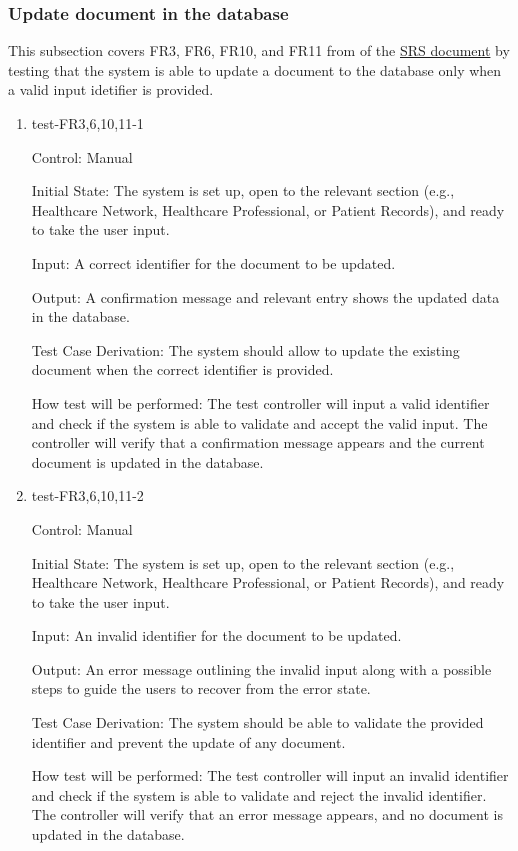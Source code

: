 \documentclass[12pt, titlepage]{article}
\begin{document}
\subsubsection{Update document in the database} \label{section:4.1.3}

This subsection covers FR3, FR6, FR10, and FR11 from of the \href{https://github.com/Inreet-Kaur/capstone/blob/main/docs/SRS/SRS.pdf}{SRS document} by testing that the system is able to update a document to the database only when a valid input idetifier is provided.

\begin{enumerate}

\item{test-FR3,6,10,11-1} \label{test-FR3,6,10,11-1}

Control: Manual

Initial State: The system is set up, open to the relevant section (e.g., Healthcare Network, Healthcare Professional, or Patient Records), and ready to take the user input.

Input: A correct identifier for the document to be updated.

Output: A confirmation message and relevant entry shows the updated data in the database.

Test Case Derivation: The system should allow to update the existing document when the correct identifier is provided.

How test will be performed: The test controller will input a valid identifier and check if the system is able to validate and accept the valid input. The controller will verify that a confirmation message appears and the current document is updated in the database.


\item{test-FR3,6,10,11-2} \label{test-FR3,6,10,11-2}

Control: Manual

Initial State: The system is set up, open to the relevant section (e.g., Healthcare Network, Healthcare Professional, or Patient Records), and ready to take the user input. 

Input: An invalid identifier for the document to be updated.

Output: An error message outlining the invalid input along with a possible steps to guide the users to recover from the error state.

Test Case Derivation: The system should be able to validate the provided identifier and prevent the update of any document.

How test will be performed: The test controller will input an invalid identifier and check if the system is able to validate and reject the invalid identifier. The controller will verify that an error message appears, and no document is updated in the database. 

\end{enumerate}
\end{document}
